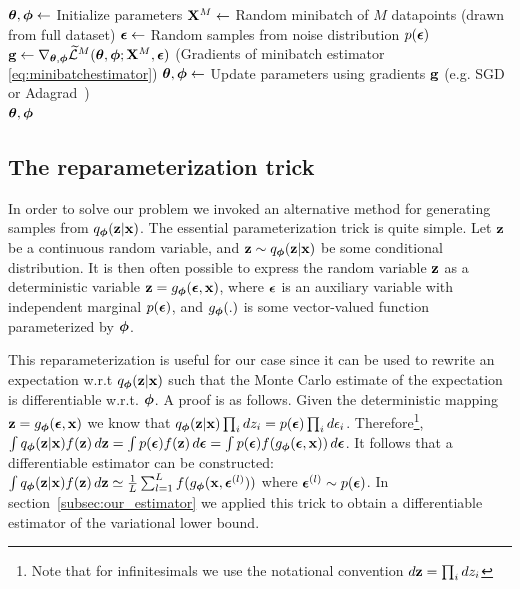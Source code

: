\documentclass{article} %
\theoremstyle{definition}
\begin{document}
\begin{algorithm}[t]
\caption{Minibatch version of the Auto-Encoding VB (AEVB) algorithm. Either of the two SGVB estimators in section~\ref{subsec:our_estimator} can be used. We use settings $M=100$ and $L=1$ in experiments. }
\renewcommand{\algorithmicforall}{\textbf{for each}}
\begin{algorithmic}
\State $\boldsymbol{\theta}, \boldsymbol{\phi} \gets$ Initialize parameters
\Repeat
\State $\mathbf{X}^M \gets $ Random minibatch of $M$ datapoints (drawn from full dataset)
\State $\boldsymbol{\epsilon} \gets $ Random samples from noise distribution $p(\boldsymbol{\epsilon})$
\State $\mathbf{g} \gets \nabla_{\boldsymbol{\theta},\boldsymbol{\phi}} \widetilde{\mathcal{L}}^{M}(\boldsymbol{\theta},\boldsymbol{\phi}; \mathbf{X}^M,\boldsymbol{\epsilon})$ (Gradients of minibatch estimator \eqref{eq:minibatchestimator})
\State $\boldsymbol{\theta}, \boldsymbol{\phi} \gets $ Update parameters using gradients $\mathbf{g}$ (e.g. SGD or Adagrad~\cite{duchi2010adaptive})
\\ \Return $\boldsymbol{\theta}, \boldsymbol{\phi}$
\end{algorithmic}
\label{algorithm}
\end{algorithm}

\subsection{The reparameterization trick}
\label{subsec:thetrick}

%
%
%
%

%

In order to solve our problem we invoked an alternative method for generating samples from $q_{\boldsymbol{\phi}}(\mathbf{z}|\mathbf{x})$. The essential parameterization trick is quite simple. Let $\mathbf{z}$ be a continuous random variable, and $\mathbf{z} \sim q_{\boldsymbol{\phi}}(\mathbf{z}|\mathbf{x})$ be some conditional distribution. It is then often possible to express the random variable $\mathbf{z}$ as a deterministic variable $\mathbf{z} = g_{\boldsymbol{\phi}}(\boldsymbol{\epsilon}, \mathbf{x})$, where $\boldsymbol{\epsilon}$ is an auxiliary variable with independent marginal $p(\boldsymbol{\epsilon})$, and $g_{\boldsymbol{\phi}}(.)$ is some vector-valued function parameterized by $\boldsymbol{\phi}$.
%

This reparameterization is useful for our case since it can be used to rewrite an expectation w.r.t $q_{\boldsymbol{\phi}}(\mathbf{z}|\mathbf{x})$ such that the Monte Carlo estimate of the expectation is differentiable w.r.t. $\boldsymbol{\phi}$. A proof is as follows. Given the deterministic mapping $\mathbf{z} = g_{\boldsymbol{\phi}}(\boldsymbol{\epsilon}, \mathbf{x})$ we know that $q_{\boldsymbol{\phi}}(\mathbf{z}|\mathbf{x}) \prod_i d z_i = p(\boldsymbol{\epsilon}) \prod_i d \epsilon_i$. Therefore\footnote{Note that for infinitesimals we use the notational convention $d\mathbf{z} = \prod_i d z_i$}, $\int q_{\boldsymbol{\phi}}(\mathbf{z}|\mathbf{x}) f(\mathbf{z}) \,d\mathbf{z} = \int p(\boldsymbol{\epsilon}) f(\mathbf{z}) \,d\boldsymbol{\epsilon} = \int p(\boldsymbol{\epsilon}) f(g_{\boldsymbol{\phi}}(\boldsymbol{\epsilon}, \mathbf{x})) \,d\boldsymbol{\epsilon}$. It follows that a differentiable estimator can be constructed: $\int q_{\boldsymbol{\phi}}(\mathbf{z}|\mathbf{x}) f(\mathbf{z}) \,d\mathbf{z} \simeq \frac{1}{L} \sum_{l=1}^L f(g_{\boldsymbol{\phi}}(\mathbf{x}, \boldsymbol{\epsilon}^{(l)}))$ where $\boldsymbol{\epsilon}^{(l)} \sim p(\boldsymbol{\epsilon})$. In section~\ref{subsec:our_estimator} we applied this trick to obtain a differentiable estimator of the variational lower bound.
\end{document}
